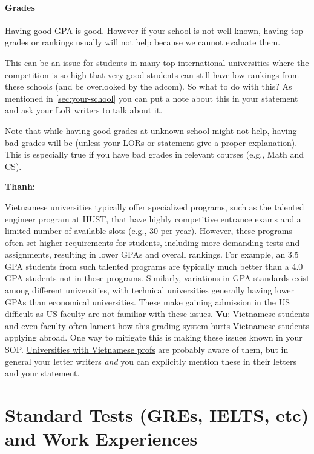 \documentclass[oneside,11pt]{book}
\newenvironment{commentbox}[1][]{
  \small
  \begin{mybox}
    {\small \textbf{#1}}
  }{
  \end{mybox}
}
\newcommand{\red}[1]{{\color{red}{#1}}}
\begin{document}
\paragraph{Grades} Having good GPA is good. However if your school is not well-known, having top grades or rankings
usually will not help because we cannot evaluate them.

This can be an issue for students in many top international universities where the competition is so high that very good students can still have low rankings from these schools (and be overlooked by the adcom).
So what to do with this? As mentioned in \autoref{sec:your-school} you can put a note about this in your statement and ask your LoR writers to talk about it.

Note that while having good grades at unknown school might not help,
having bad grades will be \red{red flag} (unless your LORs or
statement give a proper explanation). This is especially true if you
have bad grades in relevant courses (e.g., Math and CS).

\begin{commentbox}[Thanh:]
  Vietnamese universities typically offer specialized programs, such as the talented engineer program at HUST, that have highly competitive entrance exams and a limited number of available slots (e.g., 30 per year). However, these programs often set higher requirements for students, including more demanding tests and assignments, resulting in lower GPAs and overall rankings. For example, an 3.5 GPA students from such talented programs are typically much better than a 4.0 GPA students not in those programs.  Similarly, variations in GPA standards exist among different universities, with technical universities generally having lower GPAs than economical universities. These make gaining admission in the US difficult as US faculty are not familiar with these issues.
  \tcblower
  \textbf{Vu}: Vietnamese students and even faculty often lament how this grading system hurts Vietnamese students applying abroad. One way to mitigate this is making these issues known in your SOP.  \href{https://github.com/dynaroars/dynaroars.github.io/wiki/Viet-CS-Profs-US}{Universities with Vietnamese profs} are probably aware of them, but in general your letter writers \emph{and} you can explicitly mention these in their letters and your statement.
\end{commentbox}

\section{Standard Tests (GREs, IELTS, etc) and Work Experiences}\label{sec:standard-tests}
\end{document}
